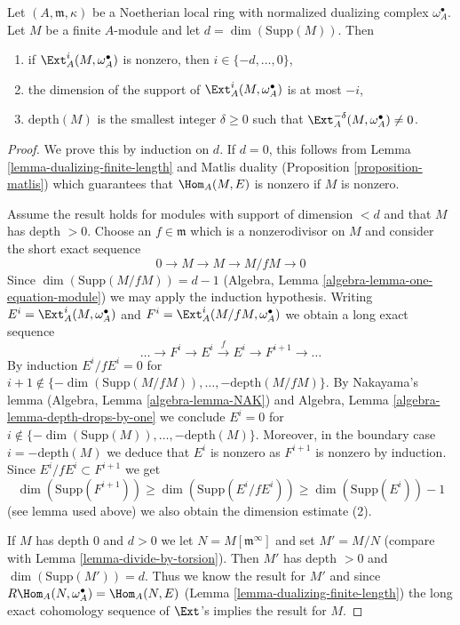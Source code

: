 \begin{lemma}
\label{lemma-sitting-in-degrees}
Let $(A, \mathfrak m, \kappa)$ be a Noetherian local ring with
normalized dualizing complex $\omega_A^\bullet$. Let $M$ be a finite
$A$-module and let $d = \dim(\text{Supp}(M))$. Then
\begin{enumerate}
\item if $\Ext^i_A(M, \omega_A^\bullet)$ is nonzero, then
$i \in \{-d, \ldots, 0\}$,
\item the dimension of the support of $\Ext^i_A(M, \omega_A^\bullet)$
is at most $-i$,
\item $\text{depth}(M)$ is the smallest integer $\delta \geq 0$ such that
$\Ext^{-\delta}_A(M, \omega_A^\bullet) \not = 0$.
\end{enumerate}
\end{lemma}

\begin{proof}
We prove this by induction on $d$. If $d = 0$, this follows from
Lemma \ref{lemma-dualizing-finite-length} and Matlis duality
(Proposition \ref{proposition-matlis}) which guarantees that
$\Hom_A(M, E)$ is nonzero if $M$ is nonzero.

\medskip\noindent
Assume the result holds for modules with support of dimension $< d$ and that
$M$ has depth $> 0$. Choose an $f \in \mathfrak m$ which is a nonzerodivisor
on $M$ and consider the short exact sequence
$$
0 \to M \to M \to M/fM \to 0
$$
Since $\dim(\text{Supp}(M/fM)) = d - 1$
(Algebra, Lemma \ref{algebra-lemma-one-equation-module}) we
may apply the induction hypothesis.
Writing
$E^i = \Ext^i_A(M, \omega_A^\bullet)$ and
$F^i = \Ext^i_A(M/fM, \omega_A^\bullet)$
we obtain a long exact sequence
$$
\ldots \to F^i \to E^i \xrightarrow{f} E^i \to F^{i + 1} \to \ldots
$$
By induction $E^i/fE^i = 0$ for
$i + 1 \not \in \{-\dim(\text{Supp}(M/fM)), \ldots, -\text{depth}(M/fM)\}$.
By Nakayama's lemma (Algebra, Lemma \ref{algebra-lemma-NAK})
and Algebra, Lemma \ref{algebra-lemma-depth-drops-by-one}
we conclude $E^i = 0$ for
$i \not \in \{-\dim(\text{Supp}(M)), \ldots, -\text{depth}(M)\}$.
Moreover, in the boundary case $i = - \text{depth}(M)$ we deduce that $E^i$
is nonzero as $F^{i + 1}$ is nonzero by induction.
Since $E^i/fE^i \subset F^{i + 1}$ we get
$$
\dim(\text{Supp}(F^{i + 1})) \geq \dim(\text{Supp}(E^i/fE^i))
\geq \dim(\text{Supp}(E^i)) - 1
$$
(see lemma used above) we also obtain the dimension estimate (2).

\medskip\noindent
If $M$ has depth $0$ and $d > 0$ we let $N = M[\mathfrak m^\infty]$ and set
$M' = M/N$ (compare with Lemma \ref{lemma-divide-by-torsion}).
Then $M'$ has depth $> 0$ and $\dim(\text{Supp}(M')) = d$.
Thus we know the result for $M'$ and since
$R\Hom_A(N, \omega_A^\bullet) = \Hom_A(N, E)$
(Lemma \ref{lemma-dualizing-finite-length})
the long exact cohomology sequence of $\Ext$'s implies the
result for $M$.
\end{proof}


